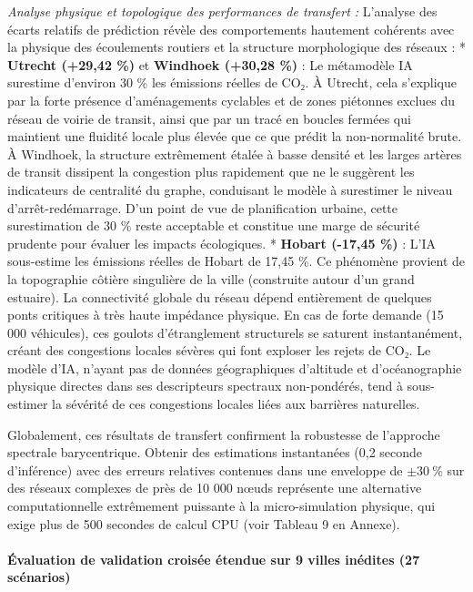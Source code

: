 \documentclass[10pt, a4paper]{article}
\begin{document}
\emph{Analyse physique et topologique des performances de transfert :}
L'analyse des écarts relatifs de prédiction révèle des comportements
hautement cohérents avec la physique des écoulements routiers et la
structure morphologique des réseaux : * \textbf{Utrecht (+29,42 \%)} et
\textbf{Windhoek (+30,28 \%)} : Le métamodèle IA surestime d'environ 30
\% les émissions réelles de CO₂. À Utrecht, cela s'explique par la forte
présence d'aménagements cyclables et de zones piétonnes exclues du
réseau de voirie de transit, ainsi que par un tracé en boucles fermées
qui maintient une fluidité locale plus élevée que ce que prédit la
non-normalité brute. À Windhoek, la structure extrêmement étalée à basse
densité et les larges artères de transit dissipent la congestion plus
rapidement que ne le suggèrent les indicateurs de centralité du graphe,
conduisant le modèle à surestimer le niveau d'arrêt-redémarrage. D'un
point de vue de planification urbaine, cette surestimation de 30 \%
reste acceptable et constitue une marge de sécurité prudente pour
évaluer les impacts écologiques. * \textbf{Hobart (-17,45 \%)} : L'IA
sous-estime les émissions réelles de Hobart de 17,45 \%. Ce phénomène
provient de la topographie côtière singulière de la ville (construite
autour d'un grand estuaire). La connectivité globale du réseau dépend
entièrement de quelques ponts critiques à très haute impédance physique.
En cas de forte demande (15 000 véhicules), ces goulots d'étranglement
structurels se saturent instantanément, créant des congestions locales
sévères qui font exploser les rejets de CO₂. Le modèle d'IA, n'ayant pas
de données géographiques d'altitude et d'océanographie physique directes
dans ses descripteurs spectraux non-pondérés, tend à sous-estimer la
sévérité de ces congestions locales liées aux barrières naturelles.

Globalement, ces résultats de transfert confirment la robustesse de
l'approche spectrale barycentrique. Obtenir des estimations instantanées
(0,2 seconde d'inférence) avec des erreurs relatives contenues dans une
enveloppe de \(\pm 30\ \%\) sur des réseaux complexes de près de 10 000
nœuds représente une alternative computationnelle extrêmement puissante
à la micro-simulation physique, qui exige plus de 500 secondes de calcul
CPU (voir Tableau 9 en Annexe).

\paragraph{Évaluation de validation croisée étendue sur 9 villes
inédites (27
scénarios)}\label{uxe9valuation-de-validation-croisuxe9e-uxe9tendue-sur-9-villes-inuxe9dites-27-scuxe9narios}
\end{document}
